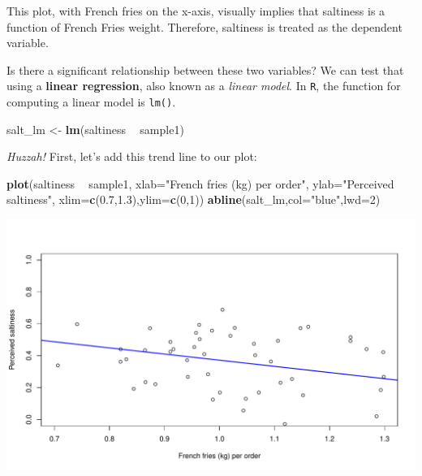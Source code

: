 \documentclass[
]{book}
\newenvironment{Shaded}{\begin{snugshade}}{\end{snugshade}}
\newcommand{\DataTypeTok}[1]{\textcolor[rgb]{0.13,0.29,0.53}{#1}}
\newcommand{\DecValTok}[1]{\textcolor[rgb]{0.00,0.00,0.81}{#1}}
\newcommand{\FloatTok}[1]{\textcolor[rgb]{0.00,0.00,0.81}{#1}}
\newcommand{\KeywordTok}[1]{\textcolor[rgb]{0.13,0.29,0.53}{\textbf{#1}}}
\newcommand{\NormalTok}[1]{#1}
\newcommand{\OperatorTok}[1]{\textcolor[rgb]{0.81,0.36,0.00}{\textbf{#1}}}
\newcommand{\StringTok}[1]{\textcolor[rgb]{0.31,0.60,0.02}{#1}}
\begin{document}
This plot, with French fries on the x-axis, visually implies that saltiness is a function of French Fries weight. Therefore, saltiness is treated as the dependent variable.

Is there a significant relationship between these two variables? We can test that using a \textbf{linear regression}, also known as a \emph{linear model}. In \texttt{R}, the function for computing a linear model is \texttt{lm()}.

\begin{Shaded}
\begin{Highlighting}[]
\NormalTok{salt_lm <-}\StringTok{ }\KeywordTok{lm}\NormalTok{(saltiness }\OperatorTok{~}\StringTok{ }\NormalTok{sample1)}
\end{Highlighting}
\end{Shaded}

\emph{Huzzah!} First, let's add this trend line to our plot:

\begin{Shaded}
\begin{Highlighting}[]
\KeywordTok{plot}\NormalTok{(saltiness }\OperatorTok{~}\StringTok{ }\NormalTok{sample1,}
     \DataTypeTok{xlab=}\StringTok{"French fries (kg) per order"}\NormalTok{,}
     \DataTypeTok{ylab=}\StringTok{"Perceived saltiness"}\NormalTok{,}
     \DataTypeTok{xlim=}\KeywordTok{c}\NormalTok{(}\FloatTok{0.7}\NormalTok{,}\FloatTok{1.3}\NormalTok{),}\DataTypeTok{ylim=}\KeywordTok{c}\NormalTok{(}\DecValTok{0}\NormalTok{,}\DecValTok{1}\NormalTok{))}
\KeywordTok{abline}\NormalTok{(salt_lm,}\DataTypeTok{col=}\StringTok{"blue"}\NormalTok{,}\DataTypeTok{lwd=}\DecValTok{2}\NormalTok{)}
\end{Highlighting}
\end{Shaded}

\includegraphics{figures/unnamed-chunk-194-1.pdf}
\end{document}
